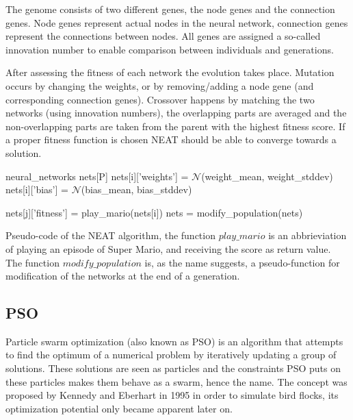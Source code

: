 \documentclass[]{article}
\begin{document}
The genome consists of two different genes, the node genes and the connection genes. Node genes represent actual nodes in the neural network, connection genes represent the connections between nodes. All genes are assigned a so-called innovation number to enable comparison between individuals and generations.\bigskip

After assessing the fitness of each network the evolution takes place. Mutation occurs by changing the weights, or by removing/adding a node gene (and corresponding connection genes). Crossover happens by matching the two networks (using innovation numbers), the overlapping parts are averaged and the non-overlapping parts are taken from the parent with the highest fitness score. If a proper fitness function is chosen NEAT should be able to converge towards a solution.\bigskip

\begin{algorithm}[h]
neural\_networks nets[P]\;
{
    nets[i]['weights'] = $\mathcal{N}$(weight\_mean, weight\_stddev)\;
    nets[i]['bias'] = $\mathcal{N}$(bias\_mean, bias\_stddev)\;
}
{
    {
        nets[j]['fitness'] = play\_mario(nets[i])\;
    }
    nets = modify\_population(nets)\;
    \caption{Pseudo-code of the NEAT algorithm, the function $play\_mario$ is an abbrieviation of playing an episode of Super Mario, and receiving the score as return value. The function $modify\_population$ is, as the name suggests, a pseudo-function for modification of the networks at the end of a generation.}
}
\end{algorithm}

\subsection{PSO} \label{Methods_PSO}
Particle swarm optimization (also known as PSO) is an algorithm that attempts to find the optimum of a numerical problem by iteratively updating a group of solutions. These solutions are seen as particles and the constraints PSO puts on these particles makes them behave as a swarm, hence the name. The concept was proposed by Kennedy and Eberhart in 1995\cite{eberhart1995new} in order to simulate bird flocks, its optimization potential only became apparent later on. \medskip
\end{document}
